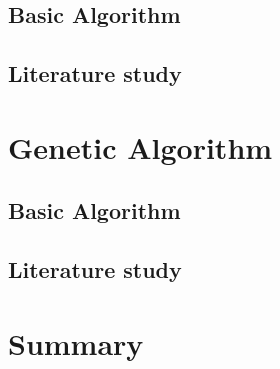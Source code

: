 \subsection{Basic Algorithm}

\subsection{Literature study}

\section{Genetic Algorithm}

\subsection{Basic Algorithm}

\subsection{Literature study}
\section {Summary}

